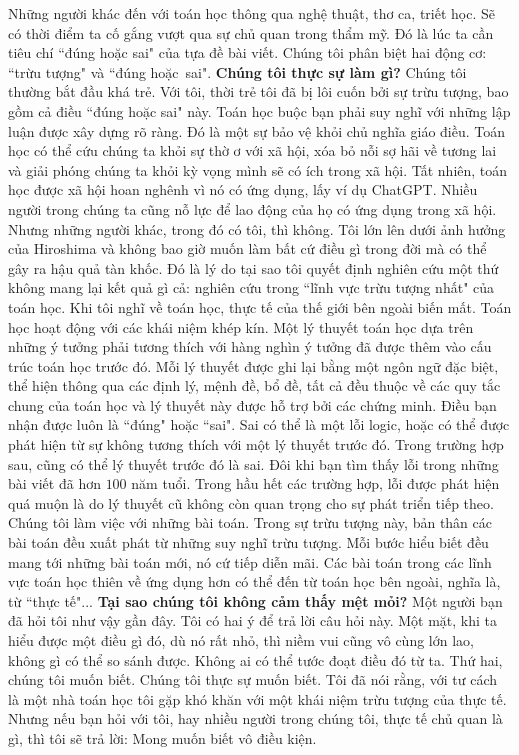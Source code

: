 \begin{multicols}{2}
	\vskip 0.1cm
	Những người khác đến với toán học thông qua nghệ thuật, thơ ca, triết học. Sẽ có thời điểm ta cố gắng vượt qua sự chủ quan trong thẩm mỹ. Đó là lúc ta cần tiêu chí ``đúng hoặc sai" của tựa đề bài viết. Chúng tôi phân biệt hai động cơ: ``trừu tượng" và ``đúng hoặc~sai".
	\vskip 0.1cm
	\textbf{\color{quantoan}Chúng tôi thực sự làm gì?}
	\vskip 0.1cm
	Chúng tôi thường bắt đầu khá trẻ. Với tôi, thời trẻ tôi đã bị lôi cuốn bởi sự trừu tượng, bao gồm cả điều ``đúng hoặc sai" này. Toán học buộc bạn phải suy nghĩ với những lập luận được xây dựng rõ ràng. Đó là một sự bảo vệ khỏi chủ nghĩa giáo điều. Toán học có thể cứu chúng ta khỏi sự thờ ơ với xã hội, xóa bỏ nỗi sợ hãi về tương lai và giải phóng chúng ta khỏi kỳ vọng mình sẽ có ích trong xã hội. Tất nhiên, toán học được xã hội hoan nghênh vì nó có ứng dụng, lấy ví dụ ChatGPT. 
	\vskip 0.1cm
	Nhiều người trong chúng ta cũng nỗ lực để lao động của họ có ứng dụng trong xã hội. Nhưng những người khác, trong đó có tôi, thì không. Tôi lớn lên dưới ảnh hưởng của Hiroshima và không bao giờ muốn làm bất cứ điều gì trong đời mà có thể gây ra hậu quả tàn khốc. Đó là lý do tại sao tôi quyết định nghiên cứu một thứ không mang lại kết quả gì cả: nghiên cứu trong ``lĩnh vực trừu tượng nhất" của toán học. Khi tôi nghĩ về toán học, thực tế của thế giới bên ngoài biến mất. Toán học hoạt động với các khái niệm khép kín. Một lý thuyết toán học dựa trên những ý tưởng phải tương thích với hàng nghìn ý tưởng đã được thêm vào cấu trúc toán học trước đó. Mỗi lý thuyết được ghi lại bằng một ngôn ngữ đặc biệt, thể hiện thông qua các định lý, mệnh đề, bổ đề, tất cả đều thuộc về các quy tắc chung của toán học và lý thuyết này được hỗ trợ bởi các chứng minh. 
	\vskip 0.1cm
	Điều bạn nhận được luôn là ``đúng" hoặc ``sai". Sai có thể là một lỗi logic, hoặc có thể được phát hiện từ sự không tương thích với một lý thuyết trước đó. Trong trường hợp sau, cũng có thể lý thuyết trước đó là sai. Đôi khi bạn tìm thấy lỗi trong những bài viết đã hơn $100$ năm tuổi. Trong hầu hết các trường hợp, lỗi được phát hiện quá muộn là do lý thuyết cũ không còn quan trọng cho sự phát triển tiếp theo. Chúng tôi làm việc với những bài toán. Trong sự trừu tượng này, bản thân các bài toán đều xuất phát từ những suy nghĩ trừu tượng. Mỗi bước hiểu biết đều mang tới những bài toán mới, nó cứ tiếp diễn mãi. Các bài toán trong các lĩnh vực toán học thiên về ứng dụng hơn có thể đến từ toán học bên ngoài, nghĩa là, từ ``thực tế"...
	\vskip 0.1cm
	\textbf{\color{quantoan}Tại sao chúng tôi không cảm thấy mệt mỏi?}
	\vskip 0.1cm
	Một người bạn đã hỏi tôi như vậy gần đây. Tôi có hai ý để trả lời câu hỏi này. Một mặt, khi ta hiểu được một điều gì đó, dù nó rất nhỏ, thì niềm vui cũng vô cùng lớn lao, không gì có thể so sánh được. Không ai có thể tước đoạt điều đó từ ta. Thứ hai, chúng tôi muốn biết. Chúng tôi thực sự muốn biết. Tôi đã nói rằng, với tư cách là một nhà toán học tôi gặp khó khăn với một khái niệm trừu tượng của thực tế. Nhưng nếu bạn hỏi với tôi, hay nhiều người trong chúng tôi, thực tế chủ quan là gì, thì tôi sẽ trả lời: Mong muốn biết vô điều kiện. 
\end{multicols}
